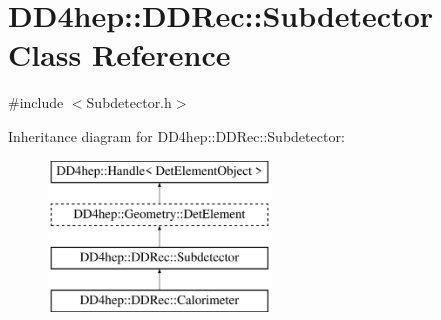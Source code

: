 \hypertarget{class_d_d4hep_1_1_d_d_rec_1_1_subdetector}{}\section{D\+D4hep\+:\+:D\+D\+Rec\+:\+:Subdetector Class Reference}
\label{class_d_d4hep_1_1_d_d_rec_1_1_subdetector}


{\ttfamily \#include $<$Subdetector.\+h$>$}

Inheritance diagram for D\+D4hep\+:\+:D\+D\+Rec\+:\+:Subdetector\+:\begin{figure}[H]
\begin{center}
\leavevmode
\includegraphics[height=4.000000cm]{class_d_d4hep_1_1_d_d_rec_1_1_subdetector}
\end{center}
\end{figure}
